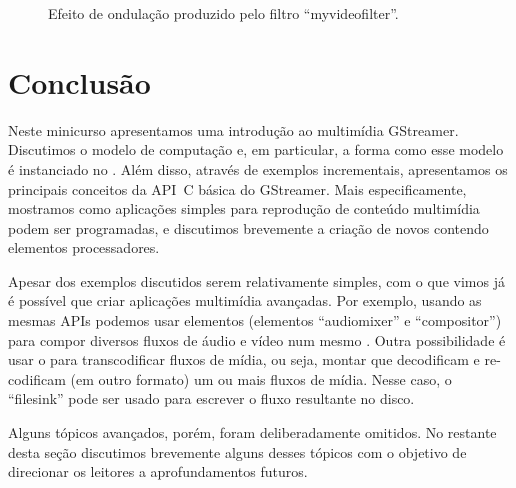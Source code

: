 \documentclass{SBCbookchapter}
\begin{document}
\begin{figure}[H]
  \centering
  \caption{Efeito de ondulação produzido pelo filtro ``myvideofilter''.}
  \label{fig:bunny-myvideofilter}
\end{figure}


\section{Conclusão}
\label{sec:conclusao}

Neste minicurso apresentamos uma introdução ao  multimídia
GStreamer.  Discutimos o modelo de computação  e, em
particular, a forma como esse modelo é instanciado no .  Além
disso, através de exemplos incrementais, apresentamos os principais
conceitos da API~C básica do GStreamer.  Mais especificamente, mostramos
como aplicações simples para reprodução de conteúdo multimídia podem ser
programadas, e discutimos brevemente a criação de novos 
contendo elementos processadores.

Apesar dos exemplos discutidos serem relativamente simples, com o que vimos
já é possível que criar aplicações multimídia avançadas.  Por exemplo,
usando as mesmas APIs podemos usar elementos  (elementos
``audiomixer'' e ``compositor'') para compor diversos fluxos de áudio e
vídeo num mesmo .  Outra possibilidade é usar o 
para transcodificar fluxos de mídia, ou seja, montar  que
decodificam e re-codificam (em outro formato) um ou mais fluxos de mídia.
Nesse caso, o  ``filesink'' pode ser usado para escrever o fluxo
resultante no disco.

Alguns tópicos avançados, porém, foram deliberadamente omitidos.  No
restante desta seção discutimos brevemente alguns desses tópicos com o
objetivo de direcionar os leitores a aprofundamentos futuros.
\end{document}
